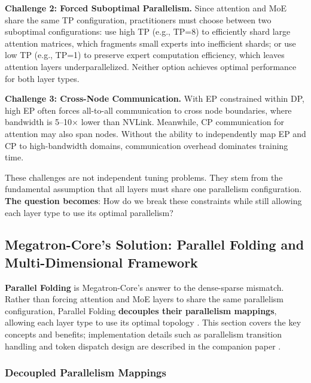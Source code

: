\textbf{Challenge 2: Forced Suboptimal Parallelism.} Since attention and MoE share the same TP configuration, practitioners must choose between two suboptimal configurations: use high TP (e.g., TP=8) to efficiently shard large attention matrices, which fragments small experts into inefficient shards; or use low TP (e.g., TP=1) to preserve expert computation efficiency, which leaves attention layers underparallelized. Neither option achieves optimal performance for both layer types.

\textbf{Challenge 3: Cross-Node Communication.} With EP constrained within DP, high EP often forces all-to-all communication to cross node boundaries, where bandwidth is 5--10$\times$ lower than NVLink. Meanwhile, CP communication for attention may also span nodes. Without the ability to independently map EP and CP to high-bandwidth domains, communication overhead dominates training time.

These challenges are not independent tuning problems. They stem from the fundamental assumption that all layers must share one parallelism configuration. \textbf{The question becomes}: How do we break these constraints while still allowing each layer type to use its optimal parallelism?

\subsection{Megatron-Core's Solution: Parallel Folding and Multi-Dimensional Framework}\label{sec:parallel-folding}

\textbf{Parallel Folding} is Megatron-Core's answer to the dense-sparse mismatch. Rather than forcing attention and MoE layers to share the same parallelism configuration, Parallel Folding \textbf{decouples their parallelism mappings}, allowing each layer type to use its optimal topology \cite{liu2025moeparallelfoldingheterogeneous}. This section covers the key concepts and benefits; implementation details such as parallelism transition handling and token dispatch design are described in the companion paper \cite{liu2025moeparallelfoldingheterogeneous}.

\subsubsection{Decoupled Parallelism Mappings}

